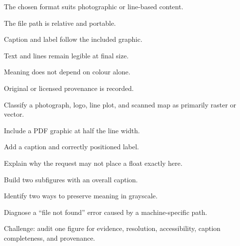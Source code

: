 \chaptercheck
\begin{chapterchecklist}
  \item The chosen format suits photographic or line-based content.
  \item The file path is relative and portable.
  \item Caption and label follow the included graphic.
  \item Text and lines remain legible at final size.
  \item Meaning does not depend on colour alone.
  \item Original or licensed provenance is recorded.
\end{chapterchecklist}

\chapterexercisestitle
\begin{chapterexercises}
  \item Classify a photograph, logo, line plot, and scanned map as primarily
        raster or vector.
  \item Include a PDF graphic at half the line width.
  \item Add a caption and correctly positioned label.
  \item Explain why the  request may not place a float exactly here.
  \item Build two subfigures with an overall caption.
  \item Identify two ways to preserve meaning in grayscale.
  \item Diagnose a ``file not found'' error caused by a machine-specific path.
  \item Challenge: audit one figure for evidence, resolution, accessibility,
        caption completeness, and provenance.
\end{chapterexercises}
